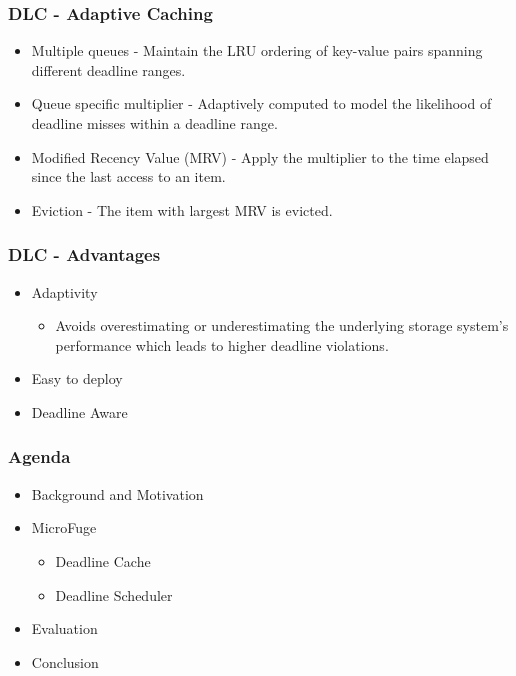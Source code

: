\documentclass{beamer}
\begin{document}
\begin{frame}
  \frametitle{DLC - Adaptive Caching}
  \begin{itemize}
  \item Multiple queues - Maintain the LRU ordering of key-value pairs spanning
    different deadline ranges.
  \item Queue specific multiplier - Adaptively computed to model the likelihood
    of deadline misses within a deadline range.
  \item Modified Recency Value (MRV) - Apply the multiplier to the time elapsed
    since the last access to an item.
  \item Eviction - The item with largest MRV is evicted.
  \end{itemize}
\end{frame}

\begin{frame}
  \frametitle{DLC - Advantages}
  \begin{itemize}
  \item Adaptivity
    \begin{itemize}
    \item Avoids overestimating or underestimating the underlying storage
      system's performance which leads to higher deadline violations.
    \end{itemize}
  \item Easy to deploy
  \item Deadline Aware
  \end{itemize}
\end{frame}

\begin{frame}
  \frametitle{Agenda}
  \begin{itemize}
  \item[\Checkmark] Background and Motivation
  \item[\Checkmark] MicroFuge
    \begin{itemize}
    \item[\Checkmark] Deadline Cache
    \item Deadline Scheduler
    \end{itemize}
  \item Evaluation
  \item Conclusion
  \end{itemize}
\end{frame}
\end{document}
